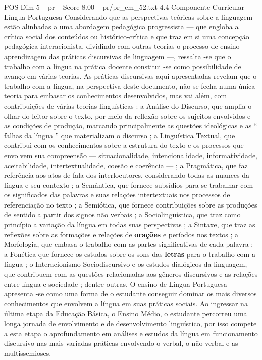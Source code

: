 \begin{textsample}{POS Dim 5 – pr – Score 8.00 – pr/pr\_em\_52.txt}  \label{ex:f5_pos_059}
4.4 Componente Curricular Língua Portuguesa Considerando que as perspectivas teóricas sobre a linguagem estão alinhadas a uma abordagem pedagógica progressista — que engloba a crítica social dos conteúdos ou histórico-crítica e que traz em si uma concepção pedagógica interacionista, dividindo com outras teorias o processo de ensino-aprendizagem das práticas discursivas de linguagem —, ressalta -se que o trabalho com a língua na prática docente constitui -se como possibilidade de avanço em várias teorias.
As práticas discursivas aqui apresentadas revelam que o trabalho com a língua, na perspectiva deste documento, não se fecha numa única teoria para embasar os conhecimentos desenvolvidos, mas vai além, com contribuições de várias teorias linguísticas : a Análise do Discurso, que amplia o olhar do leitor sobre o texto, por meio da reflexão sobre os sujeitos envolvidos e as condições de produção, marcando principalmente as questões ideológicas e as “ falhas da língua ” que materializam o discurso ; a Linguística Textual, que contribui com os conhecimentos sobre a estrutura do texto e os processos que envolvem sua compreensão — situacionalidade, intencionalidade, informatividade, aceitabilidade, intertextualidade, coesão e coerência — ; a Pragmática, que faz referência aos atos de fala dos interlocutores, considerando todas as nuances da língua e seu contexto ; a Semântica, que fornece subsídios para se trabalhar com os significados das palavras e suas relações intertextuais nos processos de referenciação no texto ; a Semiótica, que fornece contribuições sobre as produções de sentido a partir dos signos não verbais ; a Sociolinguística, que traz como princípio a variação da língua em todas suas perspectivas ; a Sintaxe, que traz as reflexões sobre as formações e relações de \textbf{orações} e períodos nos textos ; a Morfologia, que embasa o trabalho com as partes significativas de cada palavra ; a Fonética que fornece os estudos sobre os sons das \textbf{letras} para o trabalho com a língua ; o Interacionismo Sociodiscursivo e os estudos dialógicos da linguagem, que contribuem com as questões relacionadas aos gêneros discursivos e as relações entre língua e sociedade ; dentre outras.
O ensino de Língua Portuguesa apresenta -se como uma forma de o estudante conseguir dominar os mais diversos conhecimentos que envolvem a língua em suas práticas sociais.
Ao ingressar na última etapa da Educação Básica, o Ensino Médio, o estudante percorreu uma longa jornada de envolvimento e de desenvolvimento linguístico, por isso compete a esta etapa o aprofundamento em análises e estudos da língua em funcionamento discursivo nas mais variadas práticas envolvendo o verbal, o não verbal e as multissemioses.

\end{textsample}
